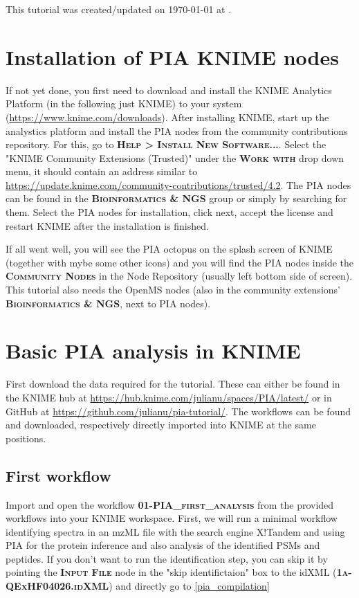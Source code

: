 \documentclass[a4paper,11pt,twoside]{article}
\newcommand{\menu}[1]{{\scshape\bfseries #1}}
\newcommand{\filepath}[1]{{\scshape\bfseries #1}}
\newcommand{\knimenode}[1]{{\scshape\bfseries #1}}
\begin{document}
This tutorial was created/updated on \today{} at \currenttime{}.


\newpage
\section{Installation of PIA KNIME nodes}

If not yet done, you first need to download and install the KNIME Analytics
Platform (in the following just KNIME) to your system
(\url{https://www.knime.com/downloads}). After installing KNIME, start up the
analystics platform and install the PIA nodes from the community contributions
repository. For this, go to \menu{Help > Install New Software...}. Select the
"KNIME Community Extensions (Trusted)" under the \menu{Work with} drop down menu, it
should contain an address similar to
\url{https://update.knime.com/community-contributions/trusted/4.2}. The PIA nodes
can be found in the \menu{Bioinformatics \& NGS} group or simply by searching
for them. Select the PIA nodes for installation, click next, accept the license
and restart KNIME after the installation is finished.

If all went well, you will see the PIA octopus on the splash screen of KNIME
(together with mybe some other icons) and you will find the PIA nodes inside the
\menu{Community Nodes} in the Node Repository (usually left bottom side of
screen). This tutorial also needs the OpenMS nodes (also in the community
extensions' \menu{Bioinformatics \& NGS}, next to PIA nodes).


\newpage
\section{Basic PIA analysis in KNIME}

First download the data required for the tutorial. These can either be found in
the KNIME hub at
\url{https://hub.knime.com/julianu/spaces/PIA/latest/}
or in GitHub at \url{https://github.com/julianu/pia-tutorial/}. The workflows can
be found and downloaded, respectively directly imported into KNIME at the same
positions.

\subsection{First workflow}

Import and open the workflow \filepath{01-PIA\_first\_analysis} from the
provided workflows into your KNIME workspace. First, we will run a minimal
workflow identifying spectra in an mzML file with the search engine X!Tandem
and using PIA for the protein inference and also analysis of the identified
PSMs and peptides. If you don't want to run the identification step, you can
skip it by pointing the \knimenode{Input File} node in the "skip
identifictaion" box to the idXML (\filepath{1a-QExHF04026.idXML}) and directly
go to \ref{pia_compilation}
\end{document}
